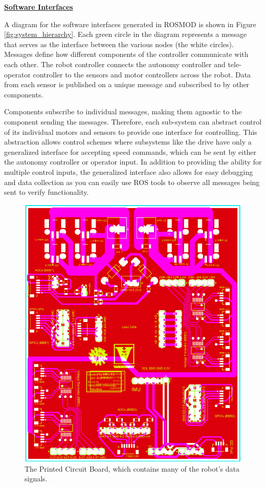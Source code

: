 \documentclass[class=article, crop=false]{standalone}
\begin{document}
	\vspace*{0.1in}
	\noindent\textbf{\underline{Software Interfaces}}
	
	A diagram for the software interfaces generated in ROSMOD is shown in Figure \ref{fig:system_hierarchy}. Each green circle in the diagram represents a message that serves as the interface between the various nodes (the white circles). Messages define how different components of the controller communicate with each other. The robot controller connects the autonomy controller and tele-operator controller to the sensors and motor controllers across the robot. Data from each sensor is published on a unique message and subscribed to by other components. 
	
	Components subscribe to individual messages, making them agnostic to the component sending the messages. Therefore, each sub-system can abstract control of its individual motors and sensors to provide one interface for controlling. This abstraction allows control schemes where subsystems like the drive have only a generalized interface for accepting speed commands, which can be sent by either the autonomy controller or operator input. In addition to providing the ability for multiple control inputs, the generalized interface also allows for easy debugging and data collection as you can easily use ROS tools to observe all messages being sent to verify functionality.
		
	\FloatBarrier
	\begin{figure}[h]
		\centering
		\includegraphics[width=0.6\linewidth]{09_Figures/pcb.jpg}
		\caption{The Printed Circuit Board, which contains many of the robot's data signals.}
		\label{fig:pcb}
	\end{figure}
	\FloatBarrier
	
	
\end{document}
